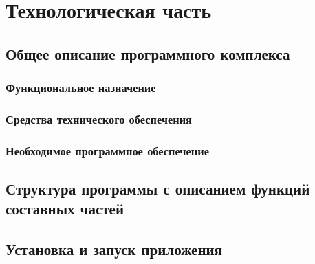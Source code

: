 \section{Технологическая часть}

\subsection{Общее описание программного комплекса}
\subsubsection{Функциональное назначение}
\subsubsection{Средства технического обеспечения}
\subsubsection{Необходимое программное обеспечение}

\subsection{Структура программы с описанием функций составных частей}

\subsection{Установка и запуск приложения}